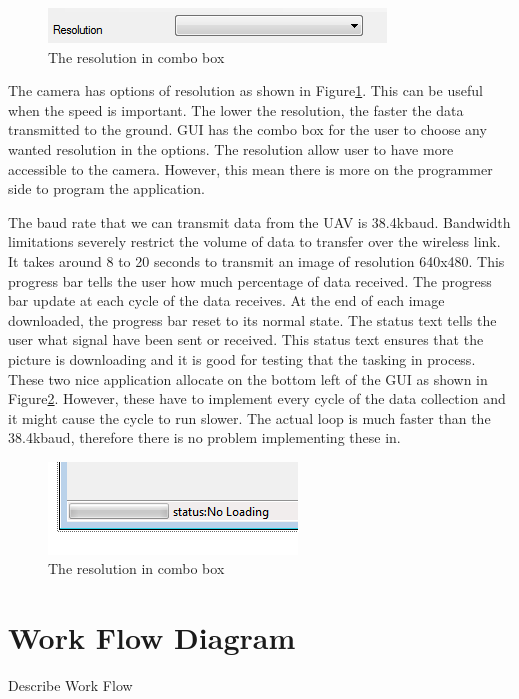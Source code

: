 \begin{figure}[H]
\begin{center}
\includegraphics[scale=1]{figures/resolutionOption.png} 
\end{center}
\caption{The resolution in combo box\label{resolutionOption}}
\end{figure}
The camera has options of resolution as shown in Figure\ref{resolutionOption}. This can be useful when the speed is important. The lower the resolution, the faster the data transmitted to the ground. GUI has the combo box for the user to choose any wanted resolution in the options. The resolution allow user to have more accessible to the camera. However, this mean there is more on the programmer side to program the application.


The baud rate that we can transmit data from the UAV is 38.4kbaud. Bandwidth limitations severely restrict the volume of data to transfer over the wireless link. It takes around 8 to 20 seconds to transmit an image of resolution 640x480. This progress bar tells the user how much percentage of data received. The progress bar update at each cycle of the data receives. At the end of each image downloaded, the progress bar reset to its normal state.  The status text tells the user what signal have been sent or received. This status text ensures that the picture is downloading and it is good for testing that the tasking in process. These two nice application allocate on the bottom left of the GUI as shown in Figure\ref{progressBar}. However, these have to implement every cycle of the data collection and it might cause the cycle to run slower. The actual loop is much faster than the 38.4kbaud, therefore there is no problem implementing these in.
\begin{figure}[!hbtp]
\begin{center}
\includegraphics[scale=1]{figures/progressBar.png} 
\end{center}
\caption{The resolution in combo box\label{progressBar}}
\end{figure}


\section{Work Flow Diagram}
Describe Work Flow

